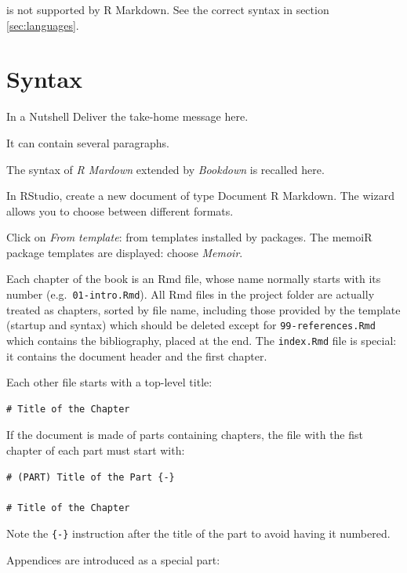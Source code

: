 \documentclass[
  12pt,
  american,
  a4paper,
  extrafontsizes,onecolumn,openright
  ]{memoir}
\newenvironment{Summary}
  {\begin{bclogo}[logo=\bctrombone, noborder=true, couleur=lightgray!50]{In a Nutshell}\parindent0pt}
  {\end{bclogo}}
\begin{document}
is not supported by R Markdown.
See the correct syntax in section \ref{sec:languages}.

\hypertarget{syntax}{%
\chapter{Syntax}\label{syntax}}

\scriptsize

\begin{Summary}
Deliver the take-home message here.

It can contain several paragraphs.
\end{Summary}

\normalsize

The syntax of \emph{R Mardown} extended by \emph{Bookdown} is recalled here.

In RStudio, create a new document of type Document R Markdown.
The wizard allows you to choose between different formats.

Click on \emph{From template}: from templates installed by packages.
The memoiR package templates are displayed: choose \emph{Memoir}.

Each chapter of the book is an Rmd file, whose name normally starts with its number (e.g.~\texttt{01-intro.Rmd}).
All Rmd files in the project folder are actually treated as chapters, sorted by file name, including those provided by the template (startup and syntax) which should be deleted except for \texttt{99-references.Rmd} which contains the bibliography, placed at the end.
The \texttt{index.Rmd} file is special: it contains the document header and the first chapter.

Each other file starts with a top-level title:

\begin{verbatim}
# Title of the Chapter
\end{verbatim}

If the document is made of parts containing chapters, the file with the fist chapter of each part must start with:

\begin{verbatim}
# (PART) Title of the Part {-}
  
# Title of the Chapter
\end{verbatim}

Note the \texttt{\{-\}} instruction after the title of the part to avoid having it numbered.

Appendices are introduced as a special part:
\end{document}
